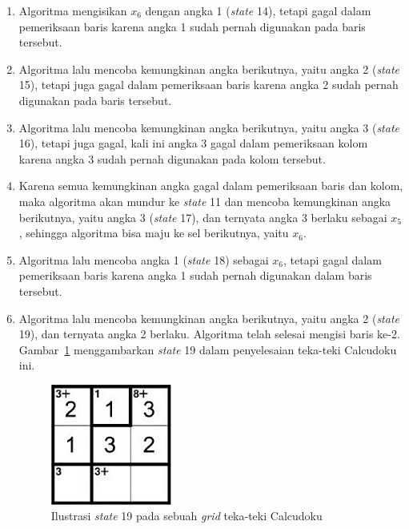 \documentclass[a4paper,twoside]{article}
\begin{document}
\begin{enumerate}
\begin{enumerate}
\item Algoritma mengisikan \begin{math}x_6\end{math} dengan angka 1 (\textit{state} 14), tetapi gagal dalam pemeriksaan baris karena angka 1 sudah pernah digunakan pada baris tersebut.
\item Algoritma lalu mencoba kemungkinan angka berikutnya, yaitu angka 2 (\textit{state} 15), tetapi juga gagal dalam pemeriksaan baris karena angka 2 sudah pernah digunakan pada baris tersebut.
\item Algoritma lalu mencoba kemungkinan angka berikutnya, yaitu angka 3 (\textit{state} 16), tetapi juga gagal, kali ini angka 3 gagal dalam pemeriksaan kolom karena angka 3 sudah pernah digunakan pada kolom tersebut.
\item Karena semua kemungkinan angka gagal dalam pemeriksaan baris dan kolom, maka algoritma akan mundur ke \textit{state} 11 dan mencoba kemungkinan angka berikutnya, yaitu angka 3 (\textit{state} 17), dan ternyata angka 3 berlaku sebagai \begin{math}x_5\end{math}, sehingga algoritma bisa maju ke sel berikutnya, yaitu \begin{math}x_6\end{math}.
\item Algoritma lalu mencoba angka 1 (\textit{state} 18) sebagai \begin{math}x_6\end{math}, tetapi gagal dalam pemeriksaan baris karena angka 1 sudah pernah digunakan dalam baris tersebut.
\item Algoritma lalu mencoba kemungkinan angka berikutnya, yaitu angka 2 (\textit{state} 19), dan ternyata angka 2 berlaku. Algoritma telah selesai mengisi baris ke-2. Gambar~\ref{fig:backtracking6} menggambarkan \textit{state} 19 dalam penyelesaian teka-teki Calcudoku ini.

\begin{figure}
\centering
\captionsetup{justification=centering}
\includegraphics[scale=1]{Gambar/Backtracking6}
\caption[Ilustrasi \textit{state} 19 pada sebuah \textit{grid} teka-teki Calcudoku ~\cite{Fahda}]{Ilustrasi \textit{state} 19 pada sebuah \textit{grid} teka-teki Calcudoku  ~\cite{Fahda}}
\label{fig:backtracking6}
\end{figure}


\end{enumerate}
\end{enumerate}
\end{document}
